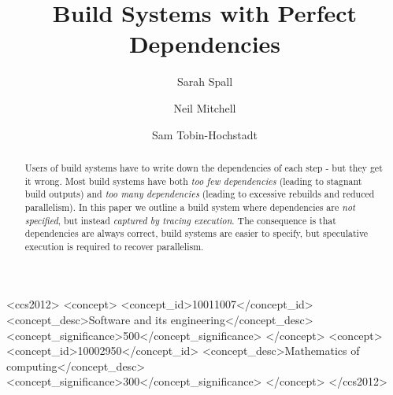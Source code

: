 \documentclass[acmsmall]{acmart}
\begin{document}
\newcommand{\Make}{\textsc{Make}\xspace}
\newcommand{\Rattle}{\textsc{Rattle}\xspace}
\newcommand{\Fabricate}{\textsc{Fabricate}\xspace}


\title{Build Systems with Perfect Dependencies}

\author{Sarah Spall}

\author{Neil Mitchell}

\author{Sam Tobin-Hochstadt}

\begin{abstract}
Users of build systems have to write down the dependencies of each step - but they get it wrong.
Most build systems have both \emph{too few dependencies} (leading to stagnant build outputs) and \emph{too many dependencies} (leading to excessive rebuilds and reduced parallelism).
In this paper we outline a build system where dependencies are \emph{not specified}, but instead \emph{captured by tracing execution}.
The consequence is that dependencies are always correct, build systems are easier to specify, but speculative execution is required to recover parallelism.
\end{abstract}

\begin{CCSXML}
<ccs2012>
<concept>
<concept_id>10011007</concept_id>
 <concept_desc>Software and its engineering</concept_desc>
<concept_significance>500</concept_significance>
</concept>
<concept>
<concept_id>10002950</concept_id>
 <concept_desc>Mathematics of computing</concept_desc>
<concept_significance>300</concept_significance>
</concept>
</ccs2012>
\end{CCSXML}

\maketitle









\end{document}
